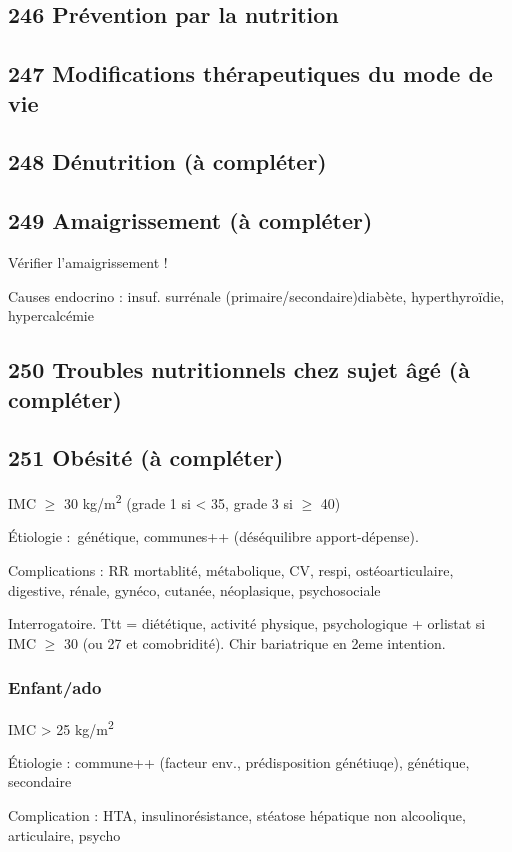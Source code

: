 \documentclass[11pt]{article}
\begin{document}
\subsection{246 Prévention par la nutrition}
\label{sec:orga976228}
\subsection{247 Modifications thérapeutiques du mode de vie}
\label{sec:org5a76e5d}
\subsection{248 Dénutrition (à compléter)}
\label{sec:org0f59f67}
\subsection{249 Amaigrissement (à compléter)}
\label{sec:org07c46a4}
Vérifier l'amaigrissement !

Causes endocrino : insuf. surrénale (primaire/secondaire)diabète, hyperthyroïdie, hypercalcémie
\subsection{250 Troubles nutritionnels chez sujet âgé (à compléter)}
\label{sec:orgb39cad6}
\subsection{251 Obésité (à compléter)}
\label{sec:org55955ff}
IMC \(\ge\) 30 kg/m\textsuperscript{2} (grade 1 si < 35, grade 3 si \(\ge\) 40)

Étiologie : génétique, communes++ (déséquilibre apport-dépense).

Complications : \inc RR mortablité, métabolique, CV, respi, ostéoarticulaire, digestive, rénale,
gynéco, cutanée, néoplasique, psychosociale

Interrogatoire. Ttt = diététique, activité physique, psychologique + orlistat si
IMC \(\ge\) 30 (ou 27 et comobridité). Chir bariatrique en 2eme intention.

\subsubsection{Enfant/ado}
\label{sec:org57c5557}
IMC > 25 kg/m\textsuperscript{2}

Étiologie : commune++ (facteur env., prédisposition génétiuqe), génétique,
secondaire

Complication : HTA, insulinorésistance, stéatose hépatique non alcoolique,
articulaire, psycho
\end{document}
